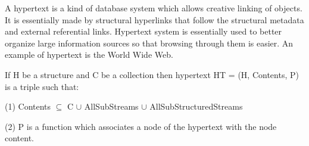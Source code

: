 \documentclass[12pt]{article}
\begin{document}
A hypertext is a kind of database system which allows creative linking of objects. It is essentially made by structural hyperlinks that follow the structural metadata and external referential links. Hypertext system is essentially used to better organize large information sources so that browsing through them is easier. An example of hypertext is the World Wide Web.

If H be a structure and C be a collection then hypertext HT = (H, Contents, P) is a triple such that:

(1) Contents $\subseteq$ C $\cup$ AllSubStreams $\cup$ AllSubStructuredStreams

(2) P is a function which associates a node of the hypertext with the node content.
\end{document}
